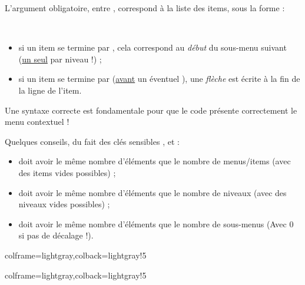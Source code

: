 \documentclass[11pt,a4paper]{ltxdoc}
\begin{document}
\medskip

L'argument obligatoire, entre , correspond à la liste des items, sous la forme :

\smallskip

\hfill{}\hfill~

\begin{itemize}
	\item si un item se termine par \MontreCode{(*)}, cela correspond au \textit{début} du sous-menu suivant (\underline{un seul} par niveau !) ;
	\item si un item se termine par \MontreCode{(>)} (\underline{avant} un éventuel \MontreCode{(*)}), une \textit{flèche} est écrite à la fin de la ligne de l'item.
\end{itemize}

Une syntaxe correcte est fondamentale pour que le code présente correctement le menu contextuel !

\vspace{5mm}

Quelques conseils, du fait des \textsf{clés sensibles} ,  et  :

\begin{itemize}
	\item {} doit avoir le même nombre d'éléments que le nombre de menus/items (avec des items vides possibles) ;
	\item {} doit avoir le même nombre d'éléments que le nombre de niveaux (avec des niveaux vides possibles) ;
	\item {} doit avoir le même nombre d'éléments que le nombre de sous-menus (Avec 0 si pas de décalage !).
\end{itemize}

\begin{tcblisting}{colframe=lightgray,colback=lightgray!5}
\end{tcblisting}

\begin{tcblisting}{colframe=lightgray,colback=lightgray!5}
\end{tcblisting}
\end{document}
